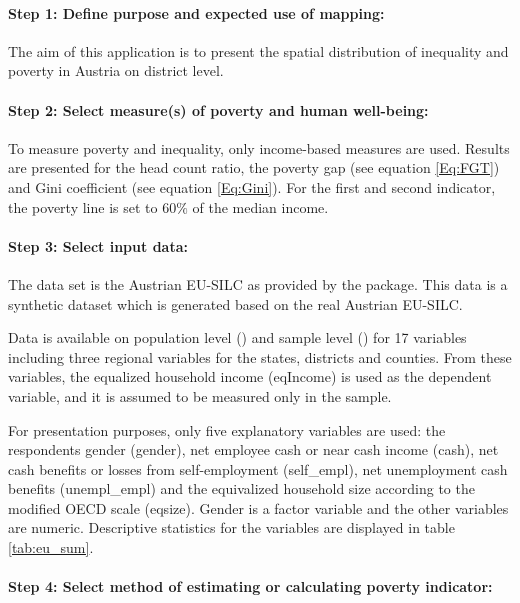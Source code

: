 \paragraph{Step 1: Define purpose and expected use of mapping:}

The aim of this application is to present the spatial distribution of inequality and poverty in Austria on district level. 


\paragraph{Step 2: Select measure(s) of poverty and human well-being:}

To measure poverty and inequality, only income-based measures are used. Results are presented for 
 the head count  ratio, the poverty gap  (see equation \eqref{Eq:FGT}) and  Gini coefficient (see equation \eqref{Eq:Gini}). 
For the first and second indicator, the poverty line is set to $60\%$ of the median income.

\paragraph{Step 3: Select input data:}

The data set is the Austrian EU-SILC  as provided by the   package.  This data is a synthetic dataset which is generated based on the real  Austrian EU-SILC. 

Data is available on  population level () and sample level () for 17 variables including  three regional variables for the states, districts and counties.
From these variables,  the equalized household income (eqIncome) is used as the dependent variable, and it is assumed to be measured only in the sample. 

For presentation purposes, only five explanatory variables are used: the respondents gender (gender),  net employee cash or near cash income (cash), net cash benefits or losses from self-employment (self\_empl), net unemployment cash benefits (unempl\_empl)  and the equivalized household size according to the modified OECD scale (eqsize). Gender is a factor variable and the other variables  are numeric.  
 Descriptive statistics for the variables are displayed in table \ref{tab:eu_sum}. 



\paragraph{Step 4: Select method of estimating or calculating poverty indicator:}


